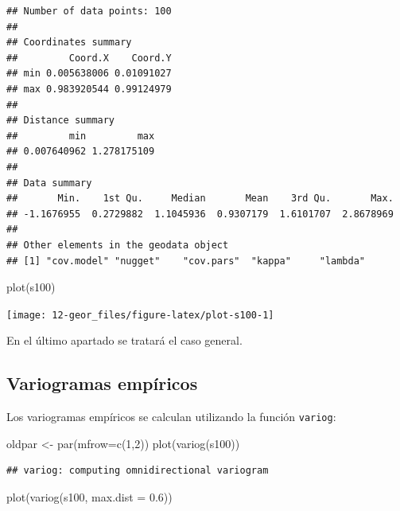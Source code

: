 \documentclass[
  spanish,
]{book}
\newenvironment{Shaded}{\begin{snugshade}}{\end{snugshade}}
\newcommand{\AttributeTok}[1]{\textcolor[rgb]{0.77,0.63,0.00}{#1}}
\newcommand{\DecValTok}[1]{\textcolor[rgb]{0.00,0.00,0.81}{#1}}
\newcommand{\FloatTok}[1]{\textcolor[rgb]{0.00,0.00,0.81}{#1}}
\newcommand{\FunctionTok}[1]{\textcolor[rgb]{0.00,0.00,0.00}{#1}}
\newcommand{\NormalTok}[1]{#1}
\newcommand{\OtherTok}[1]{\textcolor[rgb]{0.56,0.35,0.01}{#1}}
\theoremstyle{break}
\theoremstyle{definition}
\theoremstyle{definition}
\theoremstyle{definition}
\theoremstyle{definition}
\theoremstyle{remark}
\begin{document}
\begin{verbatim}
## Number of data points: 100 
## 
## Coordinates summary
##         Coord.X    Coord.Y
## min 0.005638006 0.01091027
## max 0.983920544 0.99124979
## 
## Distance summary
##         min         max 
## 0.007640962 1.278175109 
## 
## Data summary
##       Min.    1st Qu.     Median       Mean    3rd Qu.       Max. 
## -1.1676955  0.2729882  1.1045936  0.9307179  1.6101707  2.8678969 
## 
## Other elements in the geodata object
## [1] "cov.model" "nugget"    "cov.pars"  "kappa"     "lambda"
\end{verbatim}

\begin{Shaded}
\begin{Highlighting}[]
\FunctionTok{plot}\NormalTok{(s100)}
\end{Highlighting}
\end{Shaded}

\begin{center}\texttt{[image: 12-geor\_files/figure-latex/plot-s100-1]} \end{center}

En el último apartado se tratará el caso general.

\hypertarget{variogramas-empuxedricos}{%
\subsection{Variogramas empíricos}\label{variogramas-empuxedricos}}

Los variogramas empíricos se calculan utilizando la función \texttt{variog}:

\begin{Shaded}
\begin{Highlighting}[]
\NormalTok{oldpar }\OtherTok{\textless{}{-}} \FunctionTok{par}\NormalTok{(}\AttributeTok{mfrow=}\FunctionTok{c}\NormalTok{(}\DecValTok{1}\NormalTok{,}\DecValTok{2}\NormalTok{)) }
\FunctionTok{plot}\NormalTok{(}\FunctionTok{variog}\NormalTok{(s100))}
\end{Highlighting}
\end{Shaded}

\begin{verbatim}
## variog: computing omnidirectional variogram
\end{verbatim}

\begin{Shaded}
\begin{Highlighting}[]
\FunctionTok{plot}\NormalTok{(}\FunctionTok{variog}\NormalTok{(s100, }\AttributeTok{max.dist =} \FloatTok{0.6}\NormalTok{))}
\end{Highlighting}
\end{Shaded}
\end{document}
